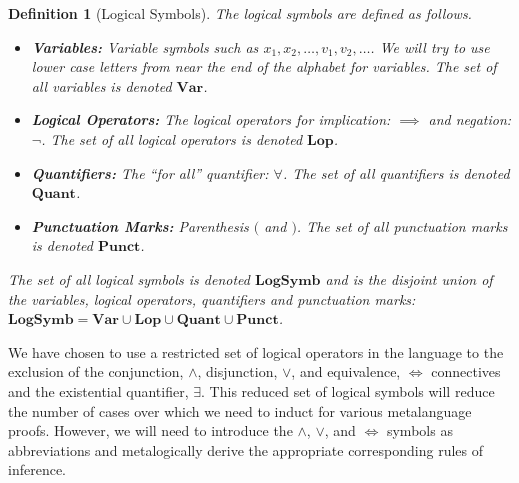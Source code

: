 \documentclass[12pt]{article}
\theoremstyle{break}
\newtheorem{definition}{Definition}[section]
\theoremstyle{break}
\theoremstyle{break}
\theoremstyle{break}
\theoremstyle{break}
\newtheorem{informal definition}[definition]{Informal Definition}
\newcommand{\qq}[1]{``#1''}
\begin{document}
\begin{definition}[Logical Symbols]
The logical symbols are defined as follows.
\begin{itemize}
\item{\textbf{Variables:} Variable symbols such as $x_1, x_2, \ldots, v_1, v_2, \ldots$. We will try to use lower case letters from near the end of the alphabet for variables. The set of all variables is denoted $\textbf{Var}$.}
\item{\textbf{Logical Operators:} The logical operators for implication: $\implies$ and negation: $\lnot$. The set of all logical operators is denoted $\textbf{Lop}$.}
\item{\textbf{Quantifiers:} The \qq{for all} quantifier: $\forall$. The set of all quantifiers is denoted $\textbf{Quant}$.}
\item{\textbf{Punctuation Marks:} Parenthesis $($ and $)$. The set of all punctuation marks is denoted $\textbf{Punct}$.}
\end{itemize}

The set of all logical symbols is denoted $\textbf{LogSymb}$ and is the disjoint union of the variables, logical operators, quantifiers and punctuation marks: $\textbf{LogSymb} = \textbf{Var} \cup \textbf{Lop} \cup \textbf{Quant} \cup \textbf{Punct}$.
\end{definition}

We have chosen to use a restricted set of logical operators in the language to the exclusion of the conjunction, $\land$, disjunction, $\lor$, and equivalence, $\iff$ connectives and the existential quantifier, $\exists$.
This reduced set of logical symbols will reduce the number of cases over which we need to induct for various metalanguage proofs.
However, we will need to introduce the $\land$, $\lor$, and $\iff$ symbols as abbreviations and metalogically derive the appropriate corresponding rules of inference.
\end{document}
